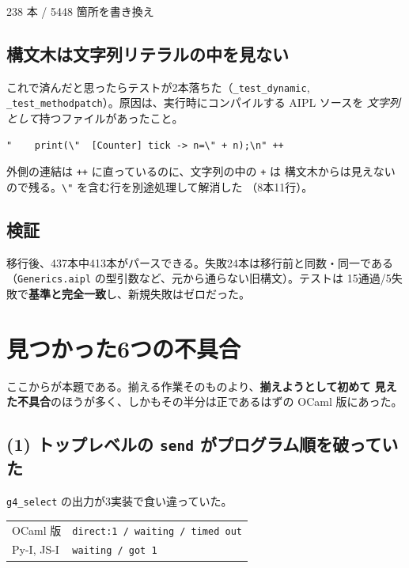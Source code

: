 \documentclass[11pt,a4paper]{ltjsarticle}
\begin{document}
\begin{center}
\small
238 本 / 5448 箇所を書き換え
\end{center}

\subsection{構文木は文字列リテラルの中を見ない}

これで済んだと思ったらテストが2本落ちた（\texttt{\_test\_dynamic},
\texttt{\_test\_methodpatch}）。原因は、実行時にコンパイルする AIPL ソースを
\emph{文字列として}持つファイルがあったこと。

\begin{lstlisting}[language=AIPL]
"    print(\"  [Counter] tick -> n=\" + n);\n" ++
\end{lstlisting}

\noindent 外側の連結は \verb|++| に直っているのに、文字列の中の \verb|+| は
構文木からは見えないので残る。\verb|\"| を含む行を別途処理して解消した
（8本11行）。

\subsection{検証}

移行後、437本中413本がパースできる。失敗24本は移行前と同数・同一である
（\texttt{Generics.aipl} の型引数など、元から通らない旧構文）。テストは
15通過/5失敗で\textbf{基準と完全一致}し、新規失敗はゼロだった。

\section{見つかった6つの不具合}

ここからが本題である。揃える作業そのものより、\textbf{揃えようとして初めて
見えた不具合}のほうが多く、しかもその半分は正であるはずの OCaml 版にあった。

\subsection{(1) トップレベルの \texttt{send} がプログラム順を破っていた}
\label{sec:order}

\texttt{g4\_select} の出力が3実装で食い違っていた。

\begin{center}
\small
\begin{tabular}{@{}ll@{}}
\toprule
OCaml 版 & \texttt{direct:1 / waiting / timed out} \\
Py-I, JS-I & \texttt{waiting / got 1} \\
\bottomrule
\end{tabular}
\end{center}
\end{document}
